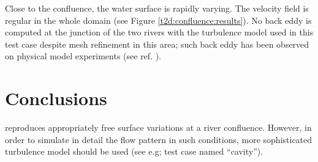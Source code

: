 %
Close to the confluence, the water surface is rapidly varying.
The velocity field is regular in the whole domain (see Figure
\ref{t2d:confluence:results}).
No back eddy is computed at the junction of the two rivers with the turbulence
model used in this test case despite mesh refinement in this area; such back
eddy has been observed on physical model experiments (see ref.
\cite{KumarGurram1997}).

\section{Conclusions}
 reproduces appropriately free surface variations at a river
confluence. However, in order to simulate in detail the flow pattern in such
conditions, more sophisticated turbulence model should be used (see e.g; test
case named ``cavity'').

